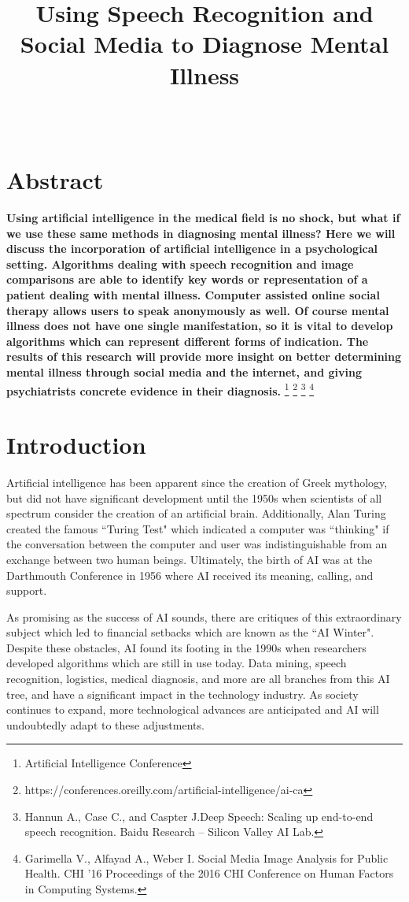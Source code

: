 \documentclass[11pt,technote,twocolumn]{IEEEtran}
\title{Using Speech Recognition and Social Media to Diagnose Mental Illness}
\author{\IEEEauthorblockN{Lynne Diep}\\
\IEEEauthorblockA{\textit{Computer Science Department, Jack Baskin School of Engineering} \\
\textit{University of California, Santa Cruz}\\
Santa Cruz, California \\
lytdiep@ucsc.edu}
}
\begin{document}
\maketitle

\section*{Abstract}
{\bf Using artificial intelligence in the medical field is no shock, but what if we use these same methods in diagnosing mental illness? Here we will discuss the incorporation of artificial intelligence in a psychological setting. Algorithms dealing with speech recognition and image comparisons are able to identify key words or representation of a patient dealing with mental illness. Computer assisted online social therapy allows users to speak anonymously as well. Of course mental illness does not have one single manifestation, so it is vital to develop algorithms which can represent different forms of indication. The results of this research will provide more insight on better determining mental illness through social media and the internet, and giving psychiatrists concrete evidence in their diagnosis.}
\footnote{Artificial Intelligence Conference} \footnote{https://conferences.oreilly.com/artificial-intelligence/ai-ca}
\footnote{Hannun A., Case C., and Caspter J.Deep Speech: Scaling up end-to-end speech recognition. Baidu Research – Silicon Valley AI Lab.}
\footnote{Garimella V., Alfayad A., Weber I. Social Media Image Analysis for Public Health. CHI '16 Proceedings of the 2016 CHI Conference on Human Factors in Computing Systems.}
\section{Introduction}
Artificial intelligence has been apparent since the creation of Greek mythology, but did not have significant development until the 1950s when scientists of all spectrum consider the creation of an artificial brain. Additionally, Alan Turing created the famous ``Turing Test" which indicated a computer was ``thinking" if the conversation between the computer and user was indistinguishable from an exchange between two human beings. Ultimately, the birth of AI was at the Darthmouth Conference in 1956 where AI received its meaning, calling, and support.
\par
As promising as the success of AI sounds, there are critiques of this extraordinary subject which led to financial setbacks which are known as the ``AI Winter". Despite these obstacles, AI found its footing in the 1990s when researchers developed algorithms which are still in use today. Data mining, speech recognition, logistics, medical diagnosis, and more are all branches from this AI tree, and have a significant impact in the technology industry. As society continues to expand, more technological advances are anticipated and AI will undoubtedly adapt to these adjustments.
\end{document}
